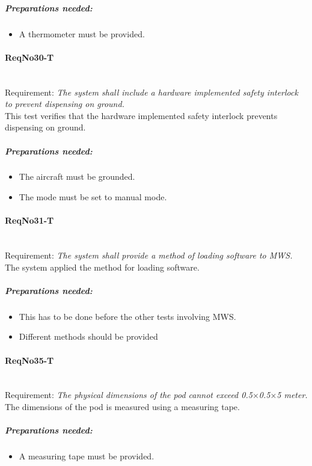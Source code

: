 	\subparagraph{Preparations needed:}
	\begin{itemize}
	\item A thermometer must be provided.
	\end{itemize} 
	
\paragraph{ReqNo30-T}\mbox{}\\ %
Requirement: \textit{The system shall include a hardware implemented safety interlock to prevent dispensing on ground.}\\

This test verifies that the hardware implemented safety interlock prevents dispensing on ground.
	\subparagraph{Preparations needed:}
	\begin{itemize}
	\item The aircraft must be grounded.
	\item The mode must be set to manual mode.
	\end{itemize}

\paragraph{ReqNo31-T}\mbox{}\\ %
Requirement: \textit{The system shall provide a method of loading software to MWS.}\\
The system applied the method for loading software.
	\subparagraph{Preparations needed:}
	\begin{itemize}
	\item This has to be done before the other tests involving MWS.
	\item Different methods should be provided
	\end{itemize}

\paragraph{ReqNo35-T}\mbox{}\\ %
Requirement: \textit{The physical dimensions of the pod cannot exceed 0.5$\times$0.5$\times$5 meter.}
\\
The dimensions of the pod is measured using a measuring tape.

	\subparagraph{Preparations needed:}
	\begin{itemize}
	\item A measuring tape must be provided.
	\end{itemize}

